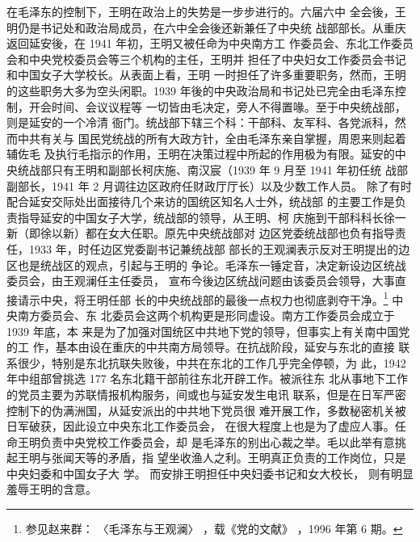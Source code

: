 在毛泽东的控制下，王明在政治上的失势是一步步进行的。六届六中
全会後，王明仍是书记处和政治局成员，在六中全会後还新兼任了中央统
战部部长。从重庆返回延安後，在 1941 年初，王明又被任命为中央南方工
作委员会、东北工作委员会和中央党校委员会等三个机构的主任，王明并
担任了中央妇女工作委员会书记和中国女子大学校长。从表面上看，王明
一时担任了许多重要职务，然而，王明的这些职务大多为空头闲职。1939
年後的中央政治局和书记处已完全由毛泽东控制，开会时间、会议议程等
一切皆由毛决定，旁人不得置喙。至于中央统战部，则是延安的一个冷清
衙门。统战部下辖三个科：干部科、友军科、各党派科，然而中共有关与
国民党统战的所有大政方针，全由毛泽东亲自掌握，周恩来则起着辅佐毛
及执行毛指示的作用，王明在决策过程中所起的作用极为有限。延安的中
央统战部只有王明和副部长柯庆施、南汉宸（1939 年 9 月至 1941 年初任统
战部副部长，1941 年 2 月调往边区政府任财政厅厅长）以及少数工作人员。
除了有时配合延安交际处出面接待几个来访的国统区知名人士外，统战部
的主要工作是负责指导延安的中国女子大学，统战部的领导，从王明、柯
庆施到干部科科长徐一新（即徐以新）都在女大任职。原先中央统战部对
边区党委统战部也负有指导责任，1933 年，时任边区党委副书记兼统战部
部长的王观澜表示反对王明提出的边区也是统战区的观点，引起与王明的
争论。毛泽东一锤定音，决定新设边区统战委员会，由王观澜任主任委员，
宣布今後边区统战问题由该委员会领导，大事直接请示中央，将王明任部
长的中央统战部的最後一点权力也彻底剥夺干净。\footnote{参见赵来群：
〈毛泽东与王观澜〉
，载《党的文献》
，1996 年第 6 期。
} 中央南方委员会、东
北委员会这两个机构更是形同虚设。南方工作委员会成立于 1939 年底，本
来是为了加强对国统区中共地下党的领导，但事实上有关南中国党的工
作，基本由设在重庆的中共南方局领导。在抗战阶段，延安与东北的直接
联系很少，特别是东北抗联失败後，中共在东北的工作几乎完全停顿，为
此，1942 年中组部曾挑选 177 名东北籍干部前往东北开辟工作。被派往东
北从事地下工作的党员主要为苏联情报机构服务，间或也与延安发生电讯
联系，但是在日军严密控制下的伪满洲国，从延安派出的中共地下党员很
难开展工作，多数秘密机关被日军破获，因此设立中央东北工作委员会，
在很大程度上也是为了虚应人事。任命王明负责中央党校工作委员会，却
是毛泽东的别出心裁之举。毛以此举有意挑起王明与张闻天等的矛盾，指
望坐收渔人之利。王明真正负责的工作岗位，只是中央妇委和中国女子大
学。
而安排王明担任中央妇委书记和女大校长，
则有明显羞辱王明的含意。

